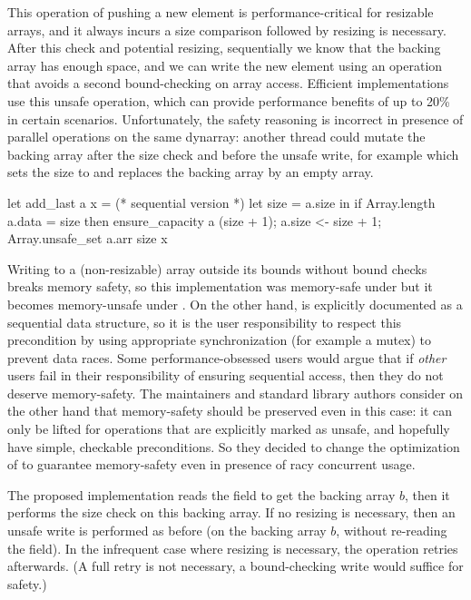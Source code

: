 This operation of pushing a new element is performance-critical for resizable arrays, and it always incurs a size comparison followed by resizing is necessary. After this check and potential resizing, sequentially we know that the backing array has enough space, and we can write the new element using an  operation that avoids a second bound-checking on array access. Efficient implementations use this unsafe operation, which can provide performance benefits of up to 20\% in certain scenarios. Unfortunately, the safety reasoning is incorrect in presence of parallel operations on the same dynarray: another thread could mutate the backing array after the size check and before the unsafe write, for example  which sets the size to  and replaces the backing array by an empty array.

\begin{ocamlcode}
let add_last a x = (* sequential version *)
  let size = a.size in
  if Array.length a.data = size then ensure_capacity a (size + 1);
  a.size <- size + 1;
  Array.unsafe_set a.arr size x
\end{ocamlcode}

Writing to a (non-resizable) array outside its bounds without bound checks breaks memory safety, so this implementation was memory-safe under \OCamlFour but it becomes memory-unsafe under \OCamlFive. On the other hand,  is explicitly documented as a sequential data structure, so it is the user responsibility to respect this precondition by using appropriate synchronization (for example a mutex) to prevent data races. Some performance-obsessed users would argue that if \emph{other} users fail in their responsibility of ensuring sequential access, then they do not deserve memory-safety. The \OCaml maintainers and standard library authors consider on the other hand that memory-safety should be preserved even in this case: it can only be lifted for operations that are explicitly marked as unsafe, and hopefully have simple, checkable preconditions. So they decided to change the optimization of  to guarantee memory-safety even in presence of racy concurrent usage.

The proposed implementation reads the  field to get the backing array $b$, then it performs the size check on this backing array. If no resizing is necessary, then an unsafe write is performed as before (on the backing array $b$, without re-reading the  field). In the infrequent case where resizing is necessary, the operation retries afterwards. (A full retry is not necessary, a bound-checking write would suffice for safety.)


